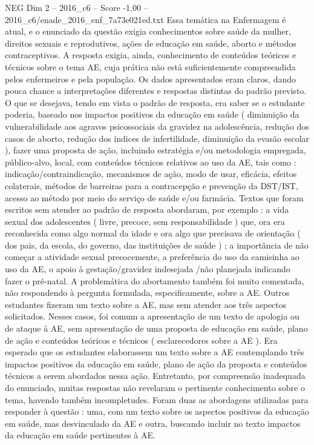 \begin{textsample}{NEG Dim 2 – 2016\_c6 – Score -1.00 – 2016\_c6/enade\_2016\_enf\_7a73e021ed.txt}
Essa temática na Enfermagem é atual, e o enunciado da questão exigia conhecimentos sobre saúde da mulher, direitos sexuais e reprodutivos, ações de educação em saúde, aborto e métodos contraceptivos.
A resposta exigia, ainda, conhecimento de conteúdos teóricos e técnicos sobre o tema AE, cuja prática não está suficientemente compreendida pelos enfermeiros e pela população.
Os dados apresentados eram claros, dando pouca chance a interpretações diferentes e respostas distintas do padrão previsto.
O que se desejava, tendo em vista o padrão de resposta, era saber se o estudante poderia, baseado nos impactos positivos da educação em saúde ( diminuição da vulnerabilidade aos agravos psicossociais da gravidez na adolescência, redução dos casos de aborto, redução dos índices de infertilidade, diminuição da evasão escolar ), fazer uma proposta de ação, incluindo estratégia e/ou metodologia empregada, público-alvo, local, com conteúdos técnicos relativos ao uso da AE, tais como : indicação/contraindicação, mecanismos de ação, modo de usar, eficácia, efeitos colaterais, métodos de barreiras para a contracepção e prevenção da DST/IST, acesso ao método por meio do serviço de saúde e/ou farmácia.
Textos que foram escritos sem atender ao padrão de resposta abordaram, por exemplo : a vida sexual dos adolescentes ( livre, precoce, sem responsabilidade ) que, ora era reconhecida como algo normal da idade e ora algo que precisava de orientação ( dos pais, da escola, do governo, das instituições de saúde ) ; a importância de não começar a atividade sexual precocemente, a preferência do uso da camisinha ao uso da AE, o apoio à gestação/gravidez indesejada /não planejada indicando fazer o pré-natal.
A problemática do abortamento também foi muito comentada, não respondendo à pergunta formulada, especificamente, sobre a AE.
Outros estudantes fizeram um texto sobre a AE, mas sem atender aos três aspectos solicitados.
Nesses casos, foi comum a apresentação de um texto de apologia ou de ataque à AE, sem apresentação de uma proposta de educação em saúde, plano de ação e conteúdos teóricos e técnicos ( esclarecedores sobre a AE ).
Era esperado que os estudantes elaborassem um texto sobre a AE contemplando três impactos positivos da educação em saúde, plano de ação da proposta e conteúdos técnicos a serem abordados nessa ação.
Entretanto, por compreensão inadequada do enunciado, muitas respostas não revelaram o pertinente conhecimento sobre o tema, havendo também incompletudes.
Foram duas as abordagens utilizadas para responder à questão : uma, com um texto sobre os aspectos positivos da educação em saúde, mas desvinculado da AE e outra, buscando incluir no texto impactos da educação em saúde pertinentes à AE.

\end{textsample}

